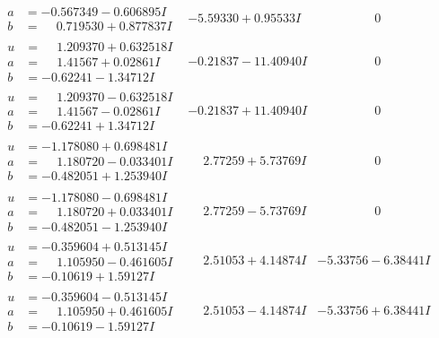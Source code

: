 \documentclass[1p]{elsarticle_modified}
\theoremstyle{definition}
\begin{document}
$$\begin{array}{c|c|c}
\begin{aligned}
a &= -0.567349 - 0.606895 I \\
b &= \phantom{-}0.719530 + 0.877837 I\end{aligned}
 & -5.59330 + 0.95533 I & \phantom{-0.000000 } 0 \\ \hline\begin{aligned}
u &= \phantom{-}1.209370 + 0.632518 I \\
a &= \phantom{-}1.41567 + 0.02861 I \\
b &= -0.62241 - 1.34712 I\end{aligned}
 & -0.21837 - 11.40940 I & \phantom{-0.000000 } 0 \\ \hline\begin{aligned}
u &= \phantom{-}1.209370 - 0.632518 I \\
a &= \phantom{-}1.41567 - 0.02861 I \\
b &= -0.62241 + 1.34712 I\end{aligned}
 & -0.21837 + 11.40940 I & \phantom{-0.000000 } 0 \\ \hline\begin{aligned}
u &= -1.178080 + 0.698481 I \\
a &= \phantom{-}1.180720 - 0.033401 I \\
b &= -0.482051 + 1.253940 I\end{aligned}
 & \phantom{-}2.77259 + 5.73769 I & \phantom{-0.000000 } 0 \\ \hline\begin{aligned}
u &= -1.178080 - 0.698481 I \\
a &= \phantom{-}1.180720 + 0.033401 I \\
b &= -0.482051 - 1.253940 I\end{aligned}
 & \phantom{-}2.77259 - 5.73769 I & \phantom{-0.000000 } 0 \\ \hline\begin{aligned}
u &= -0.359604 + 0.513145 I \\
a &= \phantom{-}1.105950 - 0.461605 I \\
b &= -0.10619 + 1.59127 I\end{aligned}
 & \phantom{-}2.51053 + 4.14874 I & -5.33756 - 6.38441 I \\ \hline\begin{aligned}
u &= -0.359604 - 0.513145 I \\
a &= \phantom{-}1.105950 + 0.461605 I \\
b &= -0.10619 - 1.59127 I\end{aligned}
 & \phantom{-}2.51053 - 4.14874 I & -5.33756 + 6.38441 I \\ \hline\begin{aligned}

\end{aligned}
\end{array}$$
\end{document}
